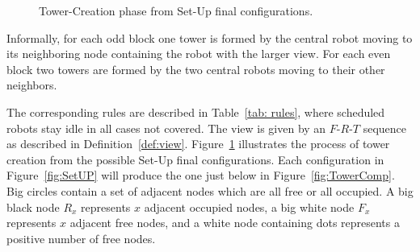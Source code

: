 \begin{figure}[htbp]
{\begin{tikzpicture}[node distance =14em, >=stealth, ->, scale=0.6, transform shape, thick]
\end{tikzpicture}
\label{fig:TowerComp} 
}
\caption{Tower-Creation phase from Set-Up final configurations.} 
\label{fig:TCP} 
\end{figure} 

Informally, for each odd block one tower is formed by the central
robot moving to its neighboring node containing the robot with the
larger view. For each even block two towers are formed by the two
central robots moving to their other neighbors.

The corresponding rules  are described in Table~\ref{tab: rules}, where scheduled
robots stay idle in all cases not covered. The view is given by an $F$-$R$-$T$ sequence
as described in Definition~\ref{def:view}.  Figure~\ref{fig:TCP}
illustrates the process of tower creation from the possible Set-Up
final configurations. Each configuration in Figure~\ref{fig:SetUP}
will produce the one just below in Figure~\ref{fig:TowerComp}. Big
circles contain a set of adjacent nodes which are all free or all
occupied.  A big black node $R_x$ represents $x$ adjacent occupied
nodes, a big white node $F_x$ represents $x$ adjacent free nodes, and
a white node containing dots represents a positive number of free
nodes.

